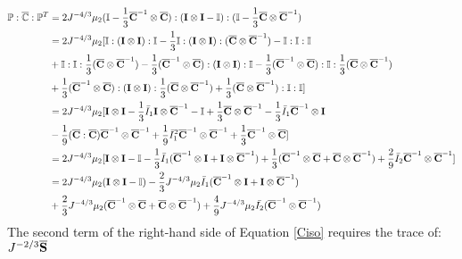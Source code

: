 \begin{equation} \label{part11}
\begin{split}
\mathbb{P} : {\overline{\mathbb{C}}} : {\mathbb{P}}^T 
&= 2J^{-4/3}\mu_2 (\mathbb{I} - \frac{1}{3}{\overline{\bold{C}}}^{-1} \otimes \overline{\bold{C}})
: (\bold{I} \otimes \bold{I} - \mathbb{I}) : (\mathbb{I} - \frac{1}{3}\overline{\bold{C}} \otimes {\overline{\bold{C}}}^{-1}) \\
&= 2J^{-4/3}\mu_2 [\mathbb{I} : (\bold{I} \otimes \bold{I}) : \mathbb{I} - \frac{1}{3}\mathbb{I} : (\bold{I} \otimes \bold{I}) : (\overline{{\bold{C}}} \otimes {\overline{\bold{C}}}^{-1}) - \mathbb{I} : \mathbb{I} : \mathbb{I} \\
&+ \mathbb{I} : \mathbb{I} : \frac{1}{3}(\overline{\bold{C}} \otimes {\overline{\bold{C}}}^{-1}) - 
\frac{1}{3}({\overline{\bold{C}}}^{-1} \otimes \overline{\bold{C}} ) : (\bold{I} \otimes \bold{I}) : \mathbb{I}
- \frac{1}{3}({\overline{\bold{C}}}^{-1} \otimes \overline{\bold{C}} ) :  \mathbb{I} : \frac{1}{3}({\overline{\bold{C}}} \otimes {\overline{\bold{C}} }^{-1}) \\
&+ \frac{1}{3}(\overline{{\bold{C}}}^{-1} \otimes \overline{\bold{C}} ) : (\bold{I} \otimes \bold{I}) : \frac{1}{3}({\overline{\bold{C}}} \otimes {\overline{\bold{C}}}^{-1} ) + \frac{1}{3}({\overline{\bold{C}}} \otimes {\overline{\bold{C}}}^{-1}) : \mathbb{I} : \mathbb{I}
] \\
&= 2J^{-4/3}\mu_2[\bold{I} \otimes \bold{I} - \frac{1}{3}\bar{I}_1\bold{I} \otimes {\overline{\bold{C}}}^{-1} - \mathbb{I} + \frac{1}{3}\overline{\bold{C}} \otimes {\overline{\bold{C}}}^{-1} -  \frac{1}{3}\bar{I}_1{\overline{\bold{C}}}^{-1} \otimes \bold{I}\\
&- \frac{1}{9}(\overline{\bold{C}} : \overline{\bold{C}}){\overline{\bold{C}}}^{-1} \otimes {\overline{\bold{C}}}^{-1} + \frac{1}{9}{\bar{I}_1}^2{\overline{\bold{C}}}^{-1} \otimes {\overline{\bold{C}}}^{-1} +  \frac{1}{3}{\overline{\bold{C}}}^{-1} \otimes {\overline{\bold{C}}}] \\
&= 2{J}^{-4/3}\mu_2 [\bold{I} \otimes \bold{I} - \mathbb{I} - \frac{1}{3}\bar{I}_1({\overline{\bold{C}}}^{-1} \otimes \bold{I} + \bold{I}\otimes{\overline{\bold{C}}}^{-1} ) +
\frac{1}{3}({\overline{\bold{C}}}^{-1} \otimes \overline{\bold{C}} + \overline{\bold{C}}\otimes{\overline{\bold{C}}}^{-1} )  + \frac{2}{9}\bar{I}_2 {\overline{\bold{C}}}^{-1} \otimes {\overline{\bold{C}}}^{-1}] \\
&= 2{J}^{-4/3}\mu_2(\bold{I} \otimes \bold{I} - \mathbb{I}) - \frac{2}{3}J^{-4/3}\mu_2\bar{I}_1({\overline{\bold{C}}}^{-1} \otimes \bold{I} + \bold{I} \otimes {\overline{\bold{C}}}^{-1}) \\
&+
\frac{2}{3}J^{-4/3}\mu_2({\overline{\bold{C}}}^{-1} \otimes {\overline{\bold{C}}} + {\overline{\bold{C}}} \otimes {\overline{\bold{C}}}^{-1}) + \frac{4}{9}J^{-4/3}\mu_2\bar{I_2}({\overline{\bold{C}}}^{-1} \otimes {\overline{\bold{C}}}^{-1})
\end{split}
\end{equation}
The second term of the right-hand side of Equation \ref{Ciso} requires the trace of: $J^{-2/3}\overline{\bold{S}}$

